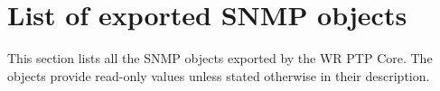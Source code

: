 \section{List of exported SNMP objects}
This section lists all the SNMP objects exported by the WR PTP Core. The objects
provide read-only values unless stated otherwise in their description.\\

\printnoidxglossary[type=snmp_status,title=,style=objtree,sort=def]
